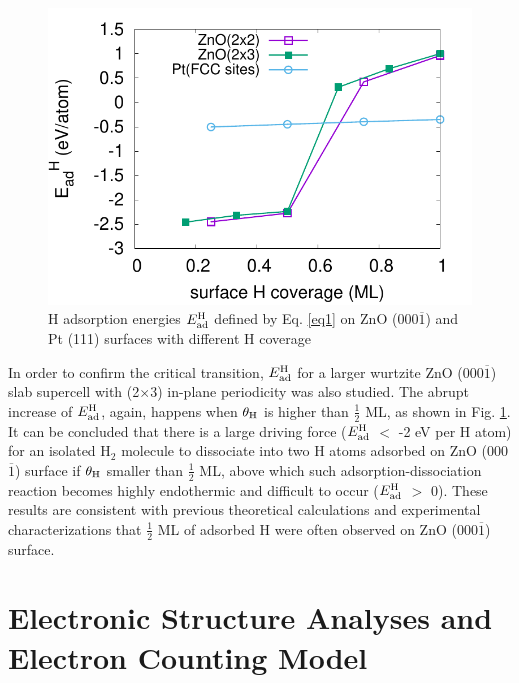 \begingroup
\begin{figure}[!ht]
  \centering
  \includegraphics[width=0.75\linewidth]{Chap1/Eadh_coverage_H.pdf}
\caption[H adsorption energies on ZnO surfaces with different H coverage]{H adsorption energies $E_{\textup{ad}}^{\textup{H}}$ defined by Eq. \ref{eq1} on ZnO (000$\overline{1}$) and Pt (111) surfaces with different H coverage}
  \label{Chap:ZnO_H:fig:Ead}
\end{figure}
\endgroup

In order to confirm the critical transition, $E_{\textup{ad}}^{\textup{H}}$ for a larger wurtzite ZnO (000$\overline{1}$) slab supercell with (2$\times$3) in-plane periodicity was also studied. The abrupt increase of $E_{\textup{ad}}^{\textup{H}}$, again, happens when $\theta_{\textup{H}}$ is higher than $\frac{1}{2}$ ML, as shown in Fig. \ref{Chap:ZnO_H:fig:Ead}. It can be concluded that there is a large driving force ($E_{\textup{ad}}^{\textup{H}}$ $<$ -2 eV per H atom) for an isolated H$_2$ molecule to dissociate into two H atoms adsorbed on ZnO (000$\overline{1}$) surface if $\theta_{\textup{H}}$ smaller than $\frac{1}{2}$ ML, above which such adsorption-dissociation reaction becomes highly endothermic and difficult to occur ($E_{\textup{ad}}^{\textup{H}}$ $>$ 0). These results are consistent with previous theoretical calculations and experimental characterizations that $\frac{1}{2}$ ML of adsorbed H were often observed on ZnO (000$\overline{1}$) surface\cite{lin2007density,meyer2004first,lauritsen2011stabilization}.

\section{Electronic Structure Analyses and Electron Counting Model}

